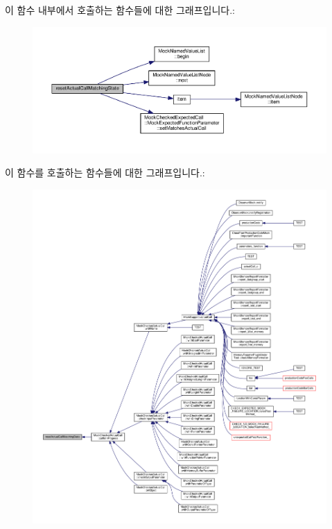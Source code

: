 이 함수 내부에서 호출하는 함수들에 대한 그래프입니다.\+:
\nopagebreak
\begin{figure}[H]
\begin{center}
\leavevmode
\includegraphics[width=350pt]{class_mock_checked_expected_call_a4c7ee87e12972e0504de732ae6f90177_cgraph}
\end{center}
\end{figure}




이 함수를 호출하는 함수들에 대한 그래프입니다.\+:
\nopagebreak
\begin{figure}[H]
\begin{center}
\leavevmode
\includegraphics[width=350pt]{class_mock_checked_expected_call_a4c7ee87e12972e0504de732ae6f90177_icgraph}
\end{center}
\end{figure}


